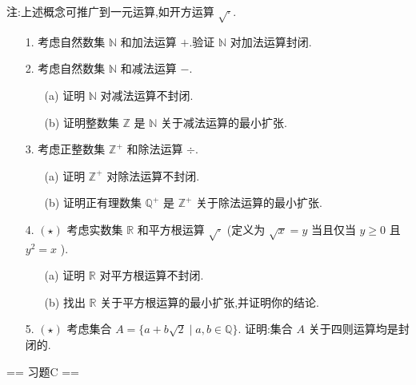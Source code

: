 注:上述概念可推广到一元运算,如开方运算 $\sqrt{\cdot}$.

\begin{enumerate}
    \item[1.]考虑自然数集 $\mathbb{N}$ 和加法运算 $+$.验证 $\mathbb{N}$ 对加法运算封闭.
    
    \item[2.]考虑自然数集 $\mathbb{N}$ 和减法运算 $-$.
        \begin{enumerate}
            \item[(a)]证明 $\mathbb{N}$ 对减法运算不封闭.
            \item[(b)]证明整数集 $\mathbb{Z}$ 是 $\mathbb{N}$ 关于减法运算的最小扩张.
        \end{enumerate}
    
    \item[3.]考虑正整数集 $\mathbb{Z}^{+}$ 和除法运算 $\div$.
        \begin{enumerate}
            \item[(a)]证明 $\mathbb{Z}^{+}$ 对除法运算不封闭.
            \item[(b)]证明正有理数集 $\mathbb{Q}^{+}$ 是 $\mathbb{Z}^{+}$ 关于除法运算的最小扩张.
        \end{enumerate}
    
    \item[4.]$(\star)$ 考虑实数集 $\mathbb{R}$ 和平方根运算 $\sqrt{\cdot}$ 
    (定义为 $\sqrt{x} = y$ 当且仅当 $y\geq 0$ 且 $y^{2} = x$ ).
        \begin{enumerate}
            \item[(a)]证明 $\mathbb{R}$ 对平方根运算不封闭.
            \item[(b)]找出 $\mathbb{R}$ 关于平方根运算的最小扩张,并证明你的结论.
        \end{enumerate}
    
    \item[5.]$(\star)$ 考虑集合 $A = \{a + b\sqrt{2}\mid a,b\in \mathbb{Q}\}$.
    证明:集合 $A$ 关于四则运算均是封闭的.
\end{enumerate}

== 习题C ==


